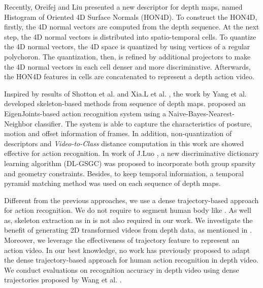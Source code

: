 \documentclass[final,3p,times,twocolumn]{elsarticle}
\begin{document}
Recently, Oreifej and Liu \cite{oreifej2013hon4d} presented a new descriptor for depth maps, named Histogram of Oriented 4D Surface Normals (HON4D). To construct the HON4D, firstly, the 4D normal vectors are computed from the depth sequence. At the next step, the 4D normal vectors is distributed into spatio-temporal cells. To quantize the 4D normal vectors, the 4D space is quantized by using vertices of a regular polychoron. The quantization, then, is refined by additional projectors to make the 4D normal vectors in each cell denser and more discriminative. Afterwards, the HON4D features in cells are concatenated to represent a depth action video.

Inspired by results of Shotton et al. \cite{shotton2013real} and Xia.L et al. \cite{xia2011human}, the work by Yang et al. \cite{yang2012eigenjoints, luo2013group} developed skeleton-based methods from sequence of depth maps.
\cite{yang2012eigenjoints} proposed an EigenJoints-based action recognition system using a Naive-Bayes-Nearest-Neighbor classifier.
The system is able to capture the characteristics of posture, motion and offset information of frames.
In addition, non-quantization of descriptors and \textit{Video-to-Class} distance computation in this work are showed effective for action recognition.
In work of J.Luo \cite{luo2013group}, a new discriminative dictionary learning algorithm (DL-GSGC) was proposed to incorporate both group sparsity and geometry constraints.
Besides, to keep temporal information, a temporal pyramid matching method was used on each sequence of depth maps.

Different from the previous approaches, we use a dense trajectory-based approach for action recognition.
We do not require to segment human body like \cite{li2010action,yang2012recognizing}.
As well as, skeleton extraction as in \cite{yang2012eigenjoints, wang2012mining} is not also required in our work.
We investigate the benefit of generating 2D transformed videos from depth data, as mentioned in \cite{li2010action,yang2012recognizing}.
Moreover, we leverage the effectiveness of trajectory feature to represent an action video.
In our best knowledge, no work has previously proposed to adapt the dense trajectory-based approach for human action recognition in depth video.
We conduct evaluations on recognition accuracy in depth video using dense trajectories proposed by Wang et al. \cite{wang2011densetraj}.
\end{document}
